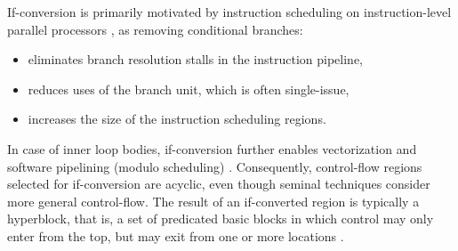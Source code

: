 If-conversion is primarily motivated by instruction scheduling on
instruction-level parallel processors \cite{Mahlke:1995:ISCA}, as removing
conditional branches: \begin{itemize} \item eliminates branch resolution stalls
in the instruction pipeline, \item reduces uses of the branch unit, which is
often single-issue, \item increases the size of the instruction scheduling
regions.  \end{itemize} In case of inner loop bodies, if-conversion further
enables vectorization \cite{Allen:1983:POPL} and software pipelining (modulo
scheduling) \cite{Park:1991:TR58}. Consequently, control-flow regions selected
for if-conversion are acyclic, even though seminal techniques
\cite{Allen:1983:POPL, Park:1991:TR58} consider more general control-flow.
The result of an if-converted region is typically a hyperblock, that is, a set
of predicated basic blocks in which control may only enter from the top, but may
exit from one or more locations \cite{Mahlke:1992:MICRO}.
\medskip

